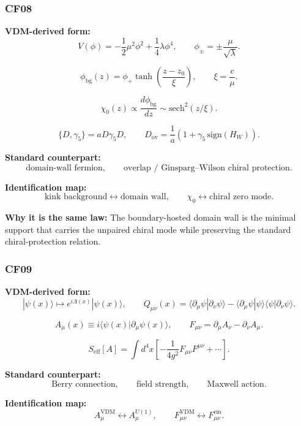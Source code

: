 \documentclass[11pt]{article}
\theoremstyle{definition}
\theoremstyle{plain}
\theoremstyle{remark}
\begin{document}

\subsubsection*{CF08}
\textbf{VDM-derived form:}
\[
V(\phi) = -\frac12\mu^2\phi^2+\frac14\lambda\phi^4,
\qquad
\phi_{\pm}=\pm\frac{\mu}{\sqrt{\lambda}}.
\]

\[
\phi_{\mathrm{bg}}(z)
=
\phi_+\tanh\!\left(\frac{z-z_0}{\xi}\right),
\qquad
\xi=\frac{c}{\mu}.
\]

\[
\chi_0(z)\propto \frac{d\phi_{\mathrm{bg}}}{dz}\sim \mathrm{sech}^2(z/\xi).
\]

\[
\{D,\gamma_5\}=aD\gamma_5D,
\qquad
D_{\mathrm{ov}}=\frac1a\left(1+\gamma_5\,\mathrm{sign}(H_W)\right).
\]

\textbf{Standard counterpart:}
\[
\text{domain-wall fermion},
\qquad
\text{overlap / Ginsparg--Wilson chiral protection}.
\]

\textbf{Identification map:}
\[
\text{kink background} \leftrightarrow \text{domain wall},
\qquad
\chi_0 \leftrightarrow \text{chiral zero mode}.
\]

\textbf{Why it is the same law:} The boundary-hosted domain wall is the
minimal support that carries the unpaired chiral mode while preserving the
standard chiral-protection relation.


\subsubsection*{CF09}
\textbf{VDM-derived form:}
\[
|\psi(x)\rangle \mapsto e^{i\Lambda(x)}|\psi(x)\rangle,
\qquad
Q_{\mu\nu}(x)
=
\langle \partial_\mu\psi|\partial_\nu\psi\rangle
-
\langle \partial_\mu\psi|\psi\rangle
\langle \psi|\partial_\nu\psi\rangle.
\]

\[
A_\mu(x)\equiv i\langle \psi(x)|\partial_\mu\psi(x)\rangle,
\qquad
F_{\mu\nu}=\partial_\mu A_\nu-\partial_\nu A_\mu.
\]

\[
S_{\mathrm{eff}}[A]
=
\int d^4x
\left[
-\frac{1}{4g^2}F_{\mu\nu}F^{\mu\nu}
+\cdots
\right].
\]

\textbf{Standard counterpart:}
\[
\text{Berry connection},
\qquad
\text{field strength},
\qquad
\text{Maxwell action}.
\]

\textbf{Identification map:}
\[
A_\mu^{\mathrm{VDM}} \leftrightarrow A_\mu^{U(1)},
\qquad
F_{\mu\nu}^{\mathrm{VDM}} \leftrightarrow F_{\mu\nu}^{\mathrm{em}}.
\]
\end{document}
